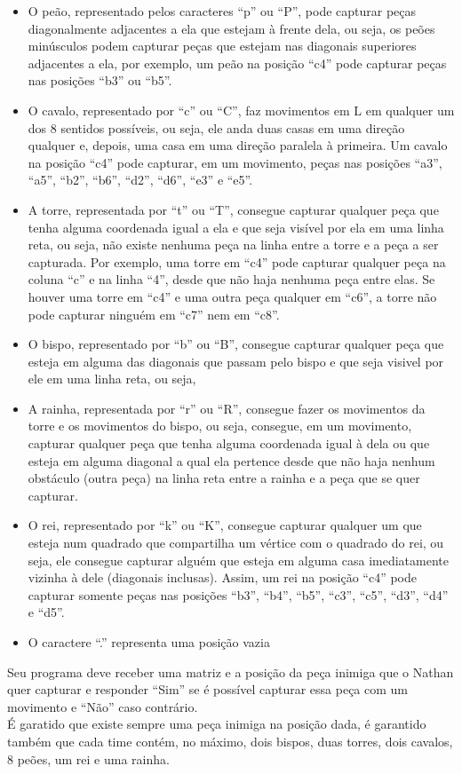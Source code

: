 \begin{itemize}
    \item O peão, representado pelos caracteres ``p'' ou ``P'', pode capturar peças diagonalmente adjacentes a ela que estejam à frente dela, ou seja, os peões minúsculos podem capturar peças que estejam nas diagonais superiores adjacentes a ela, por exemplo, um peão na posição ``c4'' pode capturar peças nas posições ``b3'' ou ``b5''.
    \item O cavalo, representado por ``c'' ou ``C'', faz movimentos em L em qualquer um dos 8 sentidos possíveis, ou seja, ele anda duas casas em uma direção qualquer e, depois, uma casa em uma direção paralela à primeira. Um cavalo na posição ``c4'' pode capturar, em um movimento, peças nas posições ``a3'', ``a5'', ``b2'', ``b6'', ``d2'', ``d6'', ``e3'' e ``e5''.
    \item A torre, representada por ``t'' ou ``T'', consegue capturar qualquer peça que tenha alguma coordenada igual a ela e que seja visível por ela em uma linha reta, ou seja, não existe nenhuma peça na linha entre a torre e a peça a ser capturada. Por exemplo, uma torre em ``c4'' pode capturar qualquer peça na coluna ``c'' e na linha ``4'', desde que não haja nenhuma peça entre elas. Se houver uma torre em ``c4'' e uma outra peça qualquer em ``c6'', a torre não pode capturar ninguém em ``c7'' nem em ``c8''.
    \item O bispo, representado por ``b'' ou ``B'', consegue capturar qualquer peça que esteja em alguma das diagonais que passam pelo bispo e que seja visivel por ele em uma linha reta, ou seja, 
    \item A rainha, representada por ``r'' ou ``R'', consegue fazer os movimentos da torre e os movimentos do bispo, ou seja, consegue, em um movimento, capturar qualquer peça que tenha alguma coordenada igual à dela ou que esteja em alguma diagonal a qual ela pertence desde que não haja nenhum obstáculo (outra peça) na linha reta entre a rainha e a peça que se quer capturar.
    \item O rei, representado por ``k'' ou ``K'', consegue capturar qualquer um que esteja num quadrado que compartilha um vértice com o quadrado do rei, ou seja, ele consegue capturar alguém que esteja em alguma casa imediatamente vizinha à dele (diagonais inclusas). Assim, um rei na posição ``c4'' pode capturar somente peças nas posições ``b3'', ``b4'', ``b5'', ``c3'', ``c5'', ``d3'', ``d4'' e ``d5''.
    \item O caractere ``.'' representa uma posição vazia
\end{itemize}
Seu programa deve receber uma matriz e a posição da peça inimiga que o Nathan quer capturar e responder ``Sim'' se é possível capturar essa peça com um movimento e ``Não'' caso contrário. \\
É garatido que existe sempre uma peça inimiga na posição dada, é garantido também que cada time contém, no máximo, dois bispos, duas torres, dois cavalos, 8 peões, um rei e uma rainha. \\


